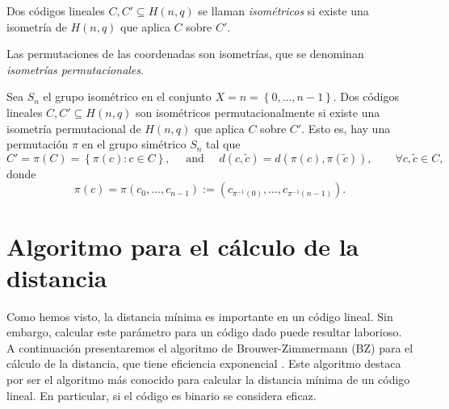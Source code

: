 \begin{definition}
    Dos códigos lineales $C, C' \subseteq H(n,q)$ se llaman \emph{isométricos} si existe una isometría de $H(n,q)$ que aplica $C$ sobre $C'$.
\end{definition}

Las permutaciones de las coordenadas son isometrías, que se denominan \emph{isometrías permutacionales}.

\begin{definition}
    Sea $S_n$ el grupo isométrico en el conjunto $X = n = \left\{ 0,..., n-1 \right\}$. Dos códigos lineales $C, C' \subseteq H(n,q)$ son isométricos permutacionalmente si existe una isometría permutacional de $H(n,q)$ que aplica $C$ sobre $C'$. Esto es, hay una permutación $\pi$ en el grupo simétrico $S_n$ tal que 
    \[
        C' = \pi (C) = \left\{ \pi(c) : c \in C \right\}, \quad \text{ and } \quad d(c, \tilde{c}) = d(\pi(c), \pi(\tilde{c})), \qquad \forall c,\tilde{c} \in C,
    \]
    donde
    \[
        \pi(c) = \pi(c_0,...,c_{n-1}) := \left( c_{\pi ^{-1} (0)}, ..., c_{\pi ^{-1} (n-1)} \right).
    \]
\end{definition}

\section{Algoritmo para el cálculo de la distancia}

Como hemos visto, la distancia mínima es importante en un código lineal. Sin embargo, calcular este parámetro para un código dado puede resultar laborioso. A continuación presentaremos el algoritmo de Brouwer-Zimmermann (BZ) para el cálculo de la distancia, que tiene eficiencia exponencial \cite[Sección 1.8]{Wassermann_2006}. Este algoritmo destaca por ser el algoritmo más conocido para calcular la distancia mínima de un código lineal. En particular, si el código es binario se considera eficaz.

